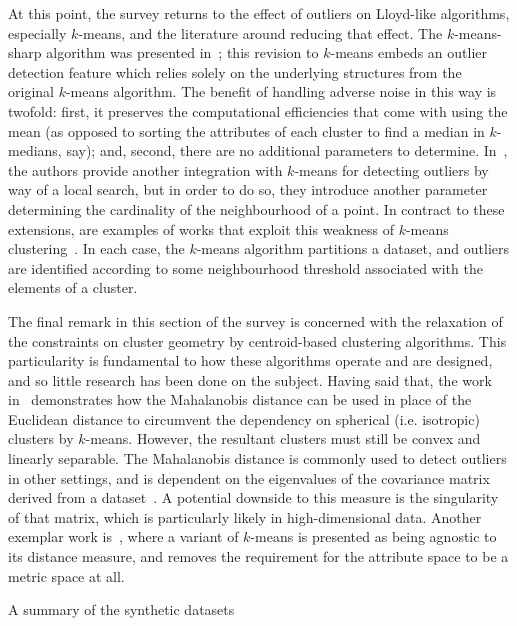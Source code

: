 At this point, the survey returns to the effect of outliers on Lloyd-like
algorithms, especially \(k\)-means, and the literature around reducing that
effect. The \(k\)-means-sharp algorithm was presented in~\cite{Olukanmi2017};
this revision to \(k\)-means embeds an outlier detection feature which relies
solely on the underlying structures from the original \(k\)-means algorithm. The
benefit of handling adverse noise in this way is twofold: first, it preserves
the computational efficiencies that come with using the mean (as opposed to
sorting the attributes of each cluster to find a median in \(k\)-medians, say);
and, second, there are no additional parameters to determine.
In~\cite{Gupta2017}, the authors provide another integration with \(k\)-means
for detecting outliers by way of a local search, but in order to do so, they
introduce another parameter determining the cardinality of the neighbourhood of
a point. In contract to these extensions, are examples of works that exploit
this weakness of \(k\)-means clustering~\cite{Lei2012,Wei2019}. In each case,
the \(k\)-means algorithm partitions a dataset, and outliers are identified
according to some neighbourhood threshold associated with the elements of a
cluster.

The final remark in this section of the survey is concerned with the relaxation
of the constraints on cluster geometry by centroid-based clustering algorithms.
This particularity is fundamental to how these algorithms operate and are
designed, and so little research has been done on the subject. Having said that,
the work in~\cite{Sung1998} demonstrates how the Mahalanobis distance can be
used in place of the Euclidean distance to circumvent the dependency on
spherical (i.e.  isotropic) clusters by \(k\)-means. However, the resultant
clusters must still be convex and linearly separable. The Mahalanobis distance
is commonly used to detect outliers in other settings, and is dependent on the
eigenvalues of the covariance matrix derived from a
dataset~\cite{Mahalanobis1936}. A potential downside to this measure is the
singularity of that matrix, which is particularly likely in high-dimensional
data. Another exemplar work is~\cite{Statman2020}, where a variant of
\(k\)-means is presented as being agnostic to its distance measure, and removes
the requirement for the attribute space to be a metric space at all.

\begin{table}
    \centering
    \resizebox{\tabwidth}{!}{%
        
    }\caption{A summary of the synthetic datasets}\label{tab:datasets}
\end{table}

